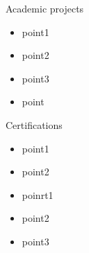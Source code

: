 \documentclass{resume} %
\begin{document}
        \begin{workSection}{Academic projects}
            
                \customItem[
                    title=prj1,
                    organization=org1,
                    duration=2021
                ]
                
                \begin{itemize}
                    \itemsep -6pt {}\item point1\item point2\item point3
                \end{itemize}
            
                \customItem[
                    title=prj2,
                    organization=org2,
                    duration=20123
                ]
                
                \begin{itemize}
                    \itemsep -6pt {}\item point
                \end{itemize}
             

        \end{workSection}  
        \begin{workSection}  {Certifications}
            
                    \customItem[
                        title=cert1,
                        organization=org1,
                        duration=dur1
                    ]
                    
                    \begin{itemize}
                        \itemsep -6pt {}\item point1\item point2
                    \end{itemize}
                
                    \customItem[
                        title=cert2,
                        organization=org2,
                        duration=dur2
                    ]
                    
                    \begin{itemize}
                        \itemsep -6pt {}\item poinrt1\item point2\item point3
                    \end{itemize}
                
            
        \end{workSection}

        
\end{document}
